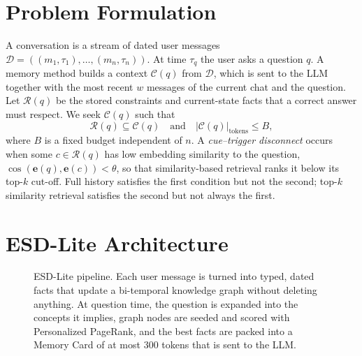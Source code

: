 \documentclass[conference]{IEEEtran}
\begin{document}
\section{Problem Formulation}
A conversation is a stream of dated user messages $\mathcal{D} = ((m_1,\tau_1),\dots,(m_n,\tau_n))$. At time $\tau_q$ the user asks a question $q$. A memory method builds a context $\mathcal{C}(q)$ from $\mathcal{D}$, which is sent to the LLM together with the most recent $w$ messages of the current chat and the question. Let $\mathcal{R}(q)$ be the stored constraints and current-state facts that a correct answer must respect. We seek $\mathcal{C}(q)$ such that
\begin{equation}
\mathcal{R}(q) \subseteq \mathcal{C}(q) \quad\text{and}\quad |\mathcal{C}(q)|_{\text{tokens}} \le B,
\end{equation}
where $B$ is a fixed budget independent of $n$. A \emph{cue--trigger disconnect} occurs when some $c \in \mathcal{R}(q)$ has low embedding similarity to the question, $\cos(\mathbf{e}(q), \mathbf{e}(c)) < \theta$, so that similarity-based retrieval ranks it below its top-$k$ cut-off. Full history satisfies the first condition but not the second; top-$k$ similarity retrieval satisfies the second but not always the first.

\section{ESD-Lite Architecture}

\begin{figure}[t]
\centering
{}
\caption{ESD-Lite pipeline. Each user message is turned into typed, dated facts that update a bi-temporal knowledge graph without deleting anything. At question time, the question is expanded into the concepts it implies, graph nodes are seeded and scored with Personalized PageRank, and the best facts are packed into a Memory Card of at most 300 tokens that is sent to the LLM.}
\label{fig_arch}
\end{figure}
\end{document}
